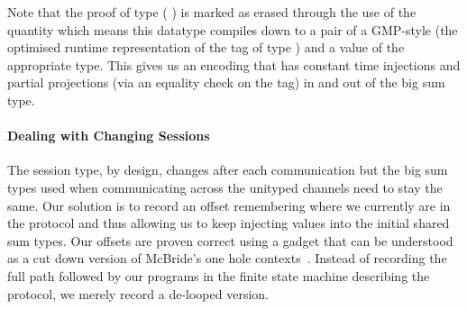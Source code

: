 \documentclass{easychair}
\begin{document}

Note that the proof of type
(   )
is marked as erased through the use of the 
quantity which means this datatype compiles down to a pair of a
GMP-style  (the optimised runtime representation of the
tag of type )
and a value of the appropriate type.
%
This gives us an encoding that has constant time injections
and partial projections (via an equality check on the  tag)
in and out of the big sum type.

\paragraph{Dealing with Changing Sessions}
The session type, by design, changes after each communication
but the big sum types used when communicating across the
unityped channels need to stay the same.
%
Our solution is to record an offset remembering where we currently
are in the protocol and thus allowing us to keep injecting values
into the initial shared sum types.
%
Our offsets are proven correct using a gadget that can be understood
as a cut down version of McBride's one hole
contexts~\cite{DBLP:conf/popl/McBride08}. Instead
of recording the full path followed by our programs in the finite
state machine describing the protocol,
we merely record a de-looped version.
\end{document}

